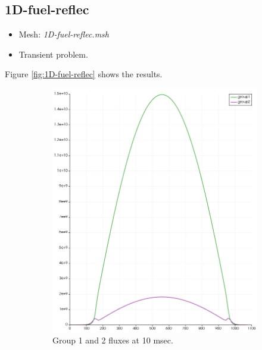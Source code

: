 \documentclass[11pt,letterpaper]{article}
\begin{document}
\subsection{1D-fuel-reflec}

	\begin{itemize}
		\item Mesh: \textit{1D-fuel-reflec.msh}
		\item Transient problem.
	\end{itemize}

Figure \ref{fig:1D-fuel-reflec} shows the results.

	\begin{figure}[htbp!]
		\centering
		\begin{subfigure}[t]{0.4\textwidth}
			\centering
			\includegraphics[width=\linewidth]{1D-fuel-reflec}
			\caption{Group 1 and 2 fluxes at 10 msec.}
		\end{subfigure}
		\begin{subfigure}[t]{0.4\textwidth}
			\centering

\end{subfigure}
\end{figure}
\end{document}
